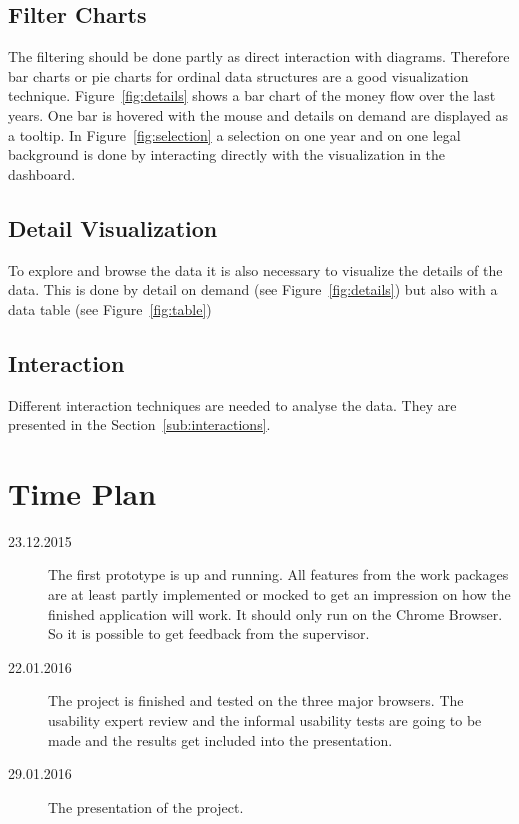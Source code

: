 \documentclass{acmsiggraph}               %
\begin{document}
\begin{appendices}
\subsection{Filter Charts}

The filtering should be done partly as direct interaction with diagrams. Therefore bar charts or pie charts for ordinal data structures are a good visualization technique. Figure~\ref{fig:details} shows a bar chart of the money flow over the last years. One bar is hovered with the mouse and details on demand are displayed as a tooltip. In Figure~\ref{fig:selection} a selection on one year and on one legal background is done by interacting directly with the visualization in the dashboard.

\subsection{Detail Visualization}

To explore and browse the data it is also necessary to visualize the details of the data. This is done by detail on demand (see Figure~\ref{fig:details}) but also with a data table (see Figure~\ref{fig:table})

\subsection{Interaction}

Different interaction techniques are needed to analyse the data. They are presented in the Section~\ref{sub:interactions}.

\section{Time Plan}

\begin{description}
  \item[23.12.2015] The first prototype is up and running. All features from the work packages are at least partly implemented or mocked to get an impression on how the finished application will work. It should only run on the Chrome Browser. So it is possible to get feedback from the supervisor.
  \item[22.01.2016] The project is finished and tested on the three major browsers. The usability expert review and the informal usability tests are going to be made and the results get included into the presentation.
  \item[29.01.2016] The presentation of the project.
\end{description}

\end{appendices}
\end{document}

